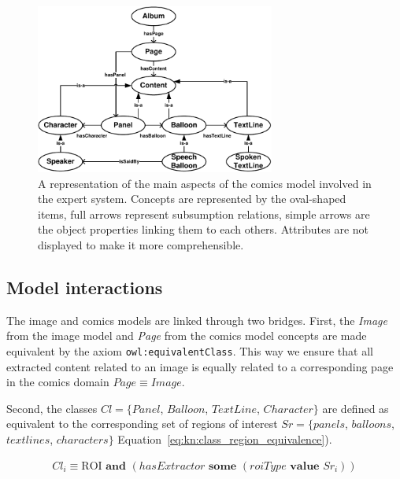  \begin{figure}[!ht]
   \centering
  \includegraphics[width=0.7\textwidth]{model_comics.pdf}
  \caption[A representation of the main aspects of the comics model involved in the expert system]{A representation of the main aspects of the comics model involved in the expert system. Concepts are represented by the oval-shaped items, full arrows represent subsumption relations, simple arrows are the object properties linking them to each others. Attributes are not displayed to make it more comprehensible.}
  \label{fig:kn:model_image}
 \end{figure}

\subsection{Model interactions}
The image and comics models are linked through two bridges.
First, the \textit{Image} from the image model and \textit{Page} from the comics model concepts are made equivalent by the axiom \texttt{owl:equivalentClass}.
This way we ensure that all extracted content related to an image is equally related to a corresponding page in the comics domain $Page \equiv  Image$.

Second, the classes $Cl=\{Panel$, $Balloon$, $TextLine$, $Character\}$ are defined as equivalent to the corresponding set of regions of interest $Sr = \{panels$, $balloons$, $text lines$, $characters\}$ Equation~\ref{eq:kn:class_region_equivalence}).%
	

\begin{equation}
\label{eq:kn:class_region_equivalence}
\begin{split}
Cl_i  \equiv \text{ROI} \textbf{ and } (hasExtractor \textbf{ some } (roiType \textbf{ value } Sr_i ))
\end{split}
\end{equation}

